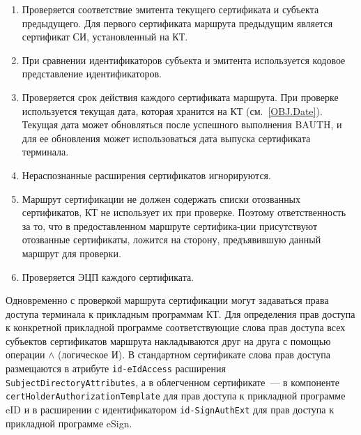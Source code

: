 \begin{enumerate}
\item
Проверяется соответствие эмитента текущего сертификата и субъекта 
предыдущего. Для первого сертификата маршрута предыдущим является 
сертификат СИ, установленный на КТ. 

\item
При сравнении идентификаторов субъекта и эмитента используется кодовое 
представление идентификаторов. 

\item
Проверяется срок действия каждого сертификата маршрута. При проверке 
используется текущая дата, которая хранится на КТ (см.~\ref{OBJ.Date}). 
Текущая дата может обновляться после успешного выполнения BAUTH, и для ее 
обновления может использоваться дата выпуска сертификата терминала. 

\item
Нераспознанные расширения сертификатов игнорируются. 

\item
Маршрут сертификации не должен содержать списки отозванных сертификатов, 
КТ не использует их при проверке. Поэтому ответственность за то, что в 
предоставленном маршруте сертифика-ции присутствуют отозванные 
сертификаты, ложится на сторону, предъявившую данный маршрут для проверки. 

\item
Проверяется ЭЦП каждого сертификата.
\end{enumerate}

Одновременно с проверкой маршрута сертификации могут задаваться права 
доступа терминала к прикладным программам КТ.
Для определения прав доступа к конкретной 
прикладной программе соответствующие слова прав доступа 
всех субъектов сертификатов маршрута накладываются друг на 
друга с помощью операции $\wedge$ (логическое И). 
В стандартном сертификате слова прав доступа размещаются в 
атрибуте \verb|id-eIdAccess| расширения \verb|SubjectDirectoryAttributes|, 
а в облегченном сертификате~--- в компоненте 
\verb|certHolderAuthorizationTemplate| для прав доступа к прикладной
программе eID и в расширении с идентификатором
\verb|id-SignAuthExt| для прав доступа к прикладной
программе eSign.





